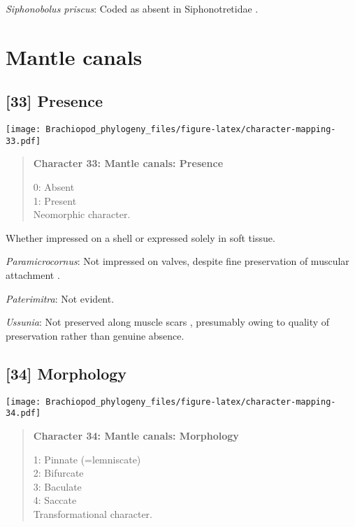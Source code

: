 \documentclass[openany]{book}
\theoremstyle{definition}
\theoremstyle{definition}
\theoremstyle{definition}
\theoremstyle{remark}
\begin{document}
\hypertarget{Siphonobolus_priscus-coding-32}{}
\emph{Siphonobolus priscus}: Coded as absent in Siphonotretidae
\citep[table 6]{Williams2000LinguliformeaCraniiformea}.

\section{Mantle canals}\label{mantle-canals}

\subsection*{{[}33{]} Presence}\label{presence-1}

\texttt{[image: Brachiopod\_phylogeny\_files/figure-latex/character-mapping-33.pdf]}

\begin{quote}
\textbf{Character 33: Mantle canals: Presence}

0: Absent\\
1: Present\\
Neomorphic character.
\end{quote}

Whether impressed on a shell or expressed solely in soft tissue.

\hypertarget{Paramicrocornus-coding-33}{}
\emph{Paramicrocornus}: Not impressed on valves, despite fine
preservation of muscular attachment \citep{Zhang2018Ahyolithid}.

\hypertarget{Paterimitra-coding-33}{}
\emph{Paterimitra}: Not evident.

\hypertarget{Ussunia-coding-33}{}
\emph{Ussunia}: Not preserved along muscle scars \citep{Nikitin1984},
presumably owing to quality of preservation rather than genuine absence.

\subsection*{{[}34{]} Morphology}\label{morphology-1}

\texttt{[image: Brachiopod\_phylogeny\_files/figure-latex/character-mapping-34.pdf]}

\begin{quote}
\textbf{Character 34: Mantle canals: Morphology}

1: Pinnate (=lemniscate)\\
2: Bifurcate\\
3: Baculate\\
4: Saccate\\
Transformational character.
\end{quote}
\end{document}
